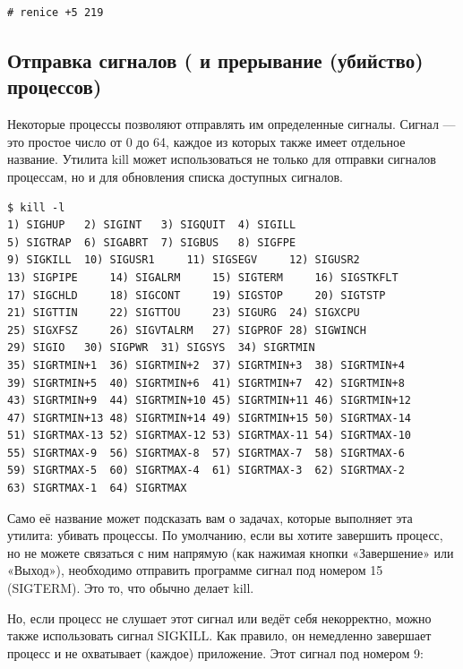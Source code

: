 \documentclass[10pt]{book}
\begin{document}
\vspace{3mm}
\begin{tcolorbox}
\begin{lstlisting}
# renice +5 219
\end{lstlisting}
\end{tcolorbox}

\subsection {Отправка сигналов ( и прерывание (убийство) процессов)}
Некоторые процессы позволяют отправлять им определенные сигналы. Сигнал — это простое число от 0 до 64, каждое из которых также имеет отдельное название. Утилита kill может использоваться не только для отправки сигналов процессам, но и для обновления списка доступных сигналов.

\vspace{3mm}
\begin{tcolorbox}
\begin{lstlisting}
$ kill -l
1) SIGHUP 	2) SIGINT 	3) SIGQUIT 	4) SIGILL
5) SIGTRAP 	6) SIGABRT 	7) SIGBUS 	8) SIGFPE 
9) SIGKILL 	10) SIGUSR1 	11) SIGSEGV 	12) SIGUSR2 
13) SIGPIPE 	14) SIGALRM 	15) SIGTERM 	16) SIGSTKFLT
17) SIGCHLD 	18) SIGCONT 	19) SIGSTOP 	20) SIGTSTP
21) SIGTTIN 	22) SIGTTOU 	23) SIGURG 	24) SIGXCPU 
25) SIGXFSZ 	26) SIGVTALRM 	27) SIGPROF	28) SIGWINCH
29) SIGIO 	30) SIGPWR 	31) SIGSYS 	34) SIGRTMIN
35) SIGRTMIN+1 	36) SIGRTMIN+2 	37) SIGRTMIN+3	38) SIGRTMIN+4
39) SIGRTMIN+5 	40) SIGRTMIN+6 	41) SIGRTMIN+7	42) SIGRTMIN+8
43) SIGRTMIN+9 	44) SIGRTMIN+10	45) SIGRTMIN+11	46) SIGRTMIN+12
47) SIGRTMIN+13	48) SIGRTMIN+14	49) SIGRTMIN+15	50) SIGRTMAX-14
51) SIGRTMAX-13	52) SIGRTMAX-12	53) SIGRTMAX-11	54) SIGRTMAX-10
55) SIGRTMAX-9 	56) SIGRTMAX-8 	57) SIGRTMAX-7	58) SIGRTMAX-6
59) SIGRTMAX-5 	60) SIGRTMAX-4 	61) SIGRTMAX-3	62) SIGRTMAX-2
63) SIGRTMAX-1 	64) SIGRTMAX
\end{lstlisting}
\end{tcolorbox}

Само её название может подсказать вам о задачах, которые выполняет эта утилита: убивать процессы. По умолчанию, если вы хотите завершить процесс, но не можете связаться с ним напрямую (как нажимая кнопки «Завершение» или «Выход»), необходимо отправить программе сигнал под номером 15 (SIGTERM). Это то, что обычно делает kill.

Но, если процесс не слушает этот сигнал или ведёт себя некорректно, можно также использовать сигнал SIGKILL. Как правило, он немедленно завершает процесс и не охватывает (каждое) приложение. Этот сигнал под номером 9:
\end{document}
